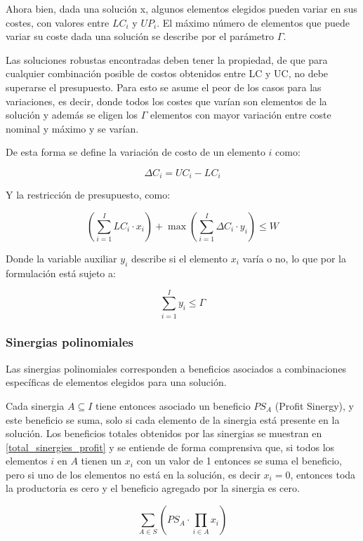 \documentclass[spanish, a4paper, 12pt, twoside, openany,final]{book}
\numberwithin{equation}{section}                %
\begin{document}
    Ahora bien, dada una solución x, algunos elementos elegidos pueden variar en sus costes, con valores entre $LC_i$ y $UP_i$. El máximo número de elementos que puede variar su coste dada una solución se describe por el parámetro $\Gamma$.
    
    Las soluciones robustas encontradas deben tener la propiedad, de que para cualquier combinación posible de costos obtenidos entre LC y UC, no debe superarse el presupuesto. Para esto se asume el peor de los casos para las variaciones, es decir, donde todos los costes que varían son elementos de la solución y además se eligen los $\Gamma$ elementos con mayor variación entre coste nominal y máximo y se varían.
    
    De esta forma se define la variación de costo de un elemento $i$ como:
    
    $$
    \Delta C_i  = UC_i - LC_i
    $$
    
    Y la restricción de presupuesto, como:
    
    \begin{equation}
    	\left( \sum_{i=1}^I LC_i\cdot x_i\right)  + \max \left( \sum_{i=1}^I \Delta C_i\cdot y_i \right) \leq W
    \end{equation}
    
    Donde la variable auxiliar $y_i$ describe si el elemento $x_i$ varía o no, lo que por la formulación está sujeto a:
    
    $$
    \sum_{i=1}^I y_i \leq \Gamma
    $$
    
    \subsubsection{Sinergias polinomiales}
    Las sinergias polinomiales corresponden a beneficios asociados a combinaciones específicas de elementos elegidos para una solución.
    
    Cada sinergia $A \subseteq I$ tiene entonces asociado un beneficio $PS_A$ (Profit Sinergy), y este beneficio se suma, solo si cada elemento de la sinergia está presente en la solución. Los beneficios totales obtenidos por las sinergias se muestran en \ref{total_sinergies_profit} y se entiende de forma comprensiva que, si todos los elementos $i$ en $A$ tienen un $x_i$ con un valor de 1 entonces se suma el beneficio, pero si uno de los elementos no está en la solución, es decir $x_i = 0$, entonces toda la productoria es cero y el beneficio agregado por la sinergia es cero.
    
    \begin{equation}
    	\label{total_sinergies_profit}
    	\sum_{A \in S}\left( PS_A \cdot \prod_{i \in A} x_i \right)
    \end{equation}
    
\end{document}
